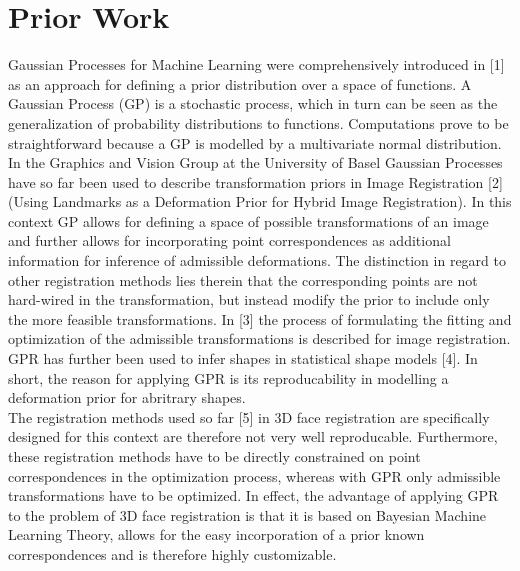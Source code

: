 \section{Prior Work}
Gaussian Processes for Machine Learning were comprehensively introduced in [1]
as an approach for defining a prior distribution over a space of functions. A Gaussian Process (GP) is a stochastic process, which in turn can be seen as the generalization of probability distributions to functions. Computations prove to be straightforward because a GP is modelled by a multivariate normal distribution. In the Graphics and Vision Group at the University of Basel Gaussian Processes have so far been used to describe transformation priors in Image Registration
[2] (Using Landmarks as a Deformation Prior for Hybrid Image Registration). In this context GP allows for defining a space of possible transformations of an image and further allows for incorporating point correspondences as additional information for inference of admissible deformations. The distinction in regard to other registration methods lies therein that the corresponding points are not hard-wired in the transformation, but instead modify the prior to include only the
more feasible transformations. In [3] the process of
formulating the fitting and optimization of the admissible transformations is described for image registration. GPR has further been used to infer shapes in statistical shape models [4]. In short, the reason for applying GPR is its reproducability in modelling a deformation prior for abritrary shapes.\\ 
The registration methods used so far [5] in 3D face registration are specifically designed for this context are therefore not very well reproducable. Furthermore, these registration methods have to be directly constrained on point correspondences in the optimization process, whereas with GPR only admissible transformations have to be optimized. In effect, the advantage of applying GPR to the problem of 3D face registration is that it is based on Bayesian Machine Learning Theory, allows for
the easy incorporation of a prior known correspondences and is therefore highly customizable.

